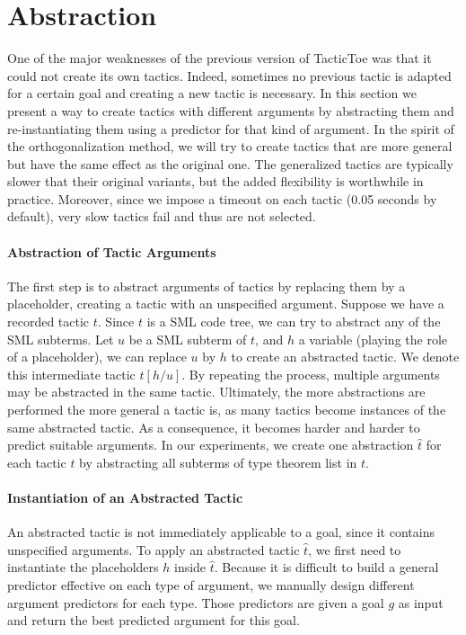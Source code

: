 \documentclass[runningheads,a4paper,draft]{svjour3}
\def\sml{\textsf{SML}\xspace}
\def\tactictoe{\textsf{TacticToe}\xspace}
\begin{document}
\section{Abstraction}\label{sec:synthesis}
One of the major weaknesses of the previous version of \tactictoe was that
it could not create its own tactics. Indeed, sometimes no previous tactic is
adapted for a certain goal and creating a new tactic is necessary.
In this section we present a way to create tactics with different arguments
by abstracting them and re-instantiating them using a predictor for that kind
of argument. In the spirit of the orthogonalization method, we will try to
create tactics that are more general but have the same effect as the
original one. The generalized tactics are typically slower that their
original variants, but the added flexibility is worthwhile in practice. Moreover,
since we impose a timeout on each tactic (0.05 seconds by default), very slow
tactics fail and thus are not selected.

\paragraph{Abstraction of Tactic Arguments}
The first step is to abstract arguments of tactics by replacing them by a
placeholder, creating a tactic with an unspecified argument.
Suppose we have a recorded tactic $t$. Since $t$ is a \sml code tree, we can
try to abstract any of the
\sml subterms. Let $u$ be a \sml subterm of $t$, and $h$ a variable (playing 
the role of a placeholder), we
can replace $u$ by $h$ to create an abstracted tactic.
We denote this intermediate tactic $t[h/u]$. By repeating the
process, multiple
arguments may be abstracted in the same tactic. Ultimately, the more
abstractions are performed the more general a tactic is, as many tactics
become instances of the same abstracted tactic. As a consequence, it becomes
harder and harder to predict suitable arguments. In our experiments, we create
one abstraction $\hat{t}$ for each tactic $t$ by abstracting all subterms of
type theorem list in $t$.

\paragraph{Instantiation of an Abstracted Tactic}
An abstracted tactic is not immediately applicable to a goal, since it contains
unspecified arguments. To apply an abstracted tactic $\hat{t}$, we first need
to
instantiate the placeholders $h$ inside $\hat{t}$. Because it is difficult to
build a general predictor effective on each type of argument, we manually
design different argument predictors for each type. Those predictors are
given a goal $g$ as input and return the best predicted argument for this
goal.
\end{document}

